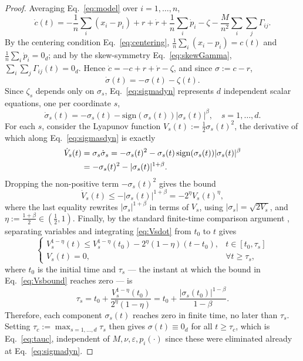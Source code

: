 \documentclass[letterpaper, 10 pt, conference]{ieeeconf}
\begin{document}
\begin{proof}
Averaging Eq.~\eqref{eq:model} over $i=1,\dots,n$,
\[
\dot c(t) = -\frac1n\sum_i(x_i-p_i) + r + \dot r + \frac1n\sum_i\dot p_i
- \zeta - \frac{M}{n^2}\sum_i\sum_j\Gamma_{ij}.
\]
By the centering condition Eq.~\eqref{eq:centering},
$\frac1n\sum_i(x_i-p_i)=c(t)$ and $\frac1n\sum_i\dot p_i=0_d$; and by
the skew-symmetry Eq.~\eqref{eq:skewGamma},
$\sum_i\sum_j\Gamma_{ij}(t)=0_d$. Hence $\dot c=-c+r+\dot r-\zeta$,
and since $\sigma:=c-r$,
\begin{equation}
\dot\sigma(t) = -\sigma(t)-\zeta(t).
\label{eq:sigmadyn}
\end{equation}
Since $\zeta_s$ depends only on $\sigma_s$, Eq.~\eqref{eq:sigmadyn}
represents $d$ independent scalar equations, one per coordinate $s$,
\begin{equation}
\dot\sigma_s(t) = -\sigma_s(t)-\mathrm{sign}(\sigma_s(t))|\sigma_s(t)|^\beta,
\quad s=1,\dots,d.
\label{eq:sigmasdyn}
\end{equation}
For each $s$, consider the Lyapunov function
$V_s(t):=\frac12\sigma_s(t)^2$, the derivative of which along
Eq.~\eqref{eq:sigmasdyn} is exactly
\begin{align}
\dot V_s(t) &= \sigma_s\dot\sigma_s
= -\sigma_s(t)^2 - \sigma_s(t)\,\mathrm{sign}(\sigma_s(t))|\sigma_s(t)|^\beta
\notag\\
&= -\sigma_s(t)^2 - |\sigma_s(t)|^{1+\beta}.
\label{eq:Vsdot_exact}
\end{align}
Dropping the non-positive term $-\sigma_s(t)^2$ gives the bound
\begin{equation}
\dot V_s(t) \le -|\sigma_s(t)|^{1+\beta} = -2^\eta V_s(t)^\eta,
\label{eq:Vsdot}
\end{equation}
where the last equality rewrites $|\sigma_s|^{1+\beta}$ in terms of
$V_s$, using $|\sigma_s|=\sqrt{2V_s}$, and
$\eta:=\frac{1+\beta}{2}\in(\frac12,1)$. Finally, by the standard finite-time 
comparison argument \cite{bhat2000finite}, separating
variables and integrating \eqref{eq:Vsdot} from $t_0$ to $t$ gives
\begin{equation}
\begin{cases}
V_s^{1-\eta}(t) \le V_s^{1-\eta}(t_0) - 2^\eta(1-\eta)(t-t_0), & t\in[t_0,\tau_s]\\
V_s(t) = 0, & \forall t\ge\tau_s,
\end{cases}
\label{eq:Vsbound}
\end{equation}
where $t_0$ is the initial time and $\tau_s$ --- the instant at which
the bound in Eq.~\eqref{eq:Vsbound} reaches zero --- is
\begin{equation}
\tau_s = t_0 + \frac{V_s^{1-\eta}(t_0)}{2^\eta(1-\eta)}
= t_0 + \frac{|\sigma_s(t_0)|^{1-\beta}}{1-\beta}.
\label{eq:taus}
\end{equation}
Therefore, each component $\sigma_s(t)$ reaches zero in finite time,
no later than $\tau_s$. Setting $\tau_c:=\max_{s=1,\dots,d}\tau_s$
then gives $\sigma(t)\equiv0_d$ for all $t\ge\tau_c$, which is
Eq.~\eqref{eq:tauc}, independent of $M,\nu,\varepsilon,p_i(\cdot)$ since
these were eliminated already at Eq.~\eqref{eq:sigmadyn}.
\end{proof}
\end{document}
